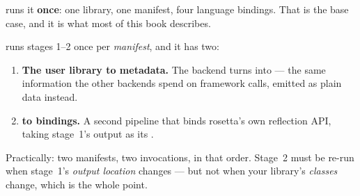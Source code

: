 runs it \textbf{once}: one library, one manifest,
four language bindings. That is the base case, and it is what most of this book
describes.

 runs stages 1--2 once per \emph{manifest}, and
it has two:

\begin{enumerate}
  \item \textbf{The user library to metadata.} The  backend turns
     into  --- the same information
    the other backends spend on framework calls, emitted as plain data instead.
  \item \textbf{ to bindings.} A second pipeline that
    binds rosetta's own reflection API, taking stage~1's output as its
    .
\end{enumerate}

Practically: two manifests, two  invocations, in that
order. Stage~2 must be re-run when stage~1's \emph{output location} changes ---
but not when your library's \emph{classes} change, which is the whole point.
